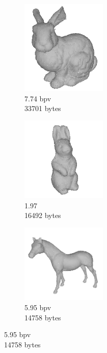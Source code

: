 \begin{figure}[!htb]
        \begin{subfigure}[b]{1.9in}
                \includegraphics[width=1.6in]{images/results/compression/bunnyd}
                \caption{7.74 bpv\\33701 bytes}
                \label{fig:FIG_BUNNYD}
        \end{subfigure}%
        \begin{subfigure}[b]{1.9in}
                \includegraphics[width=1.6in]{images/results/compression/rabbitd}
                \caption{1.97\\16492 bytes}
                \label{fig:FIG_RABBITD}
        \end{subfigure}%
        \begin{subfigure}[b]{1.9in}
                \includegraphics[width=1.6in]{images/results/compression/horsed}
                \caption{5.95 bpv\\14758 bytes}
                \label{fig:FIG_HORSED}
        \end{subfigure}
        

\end{figure}
